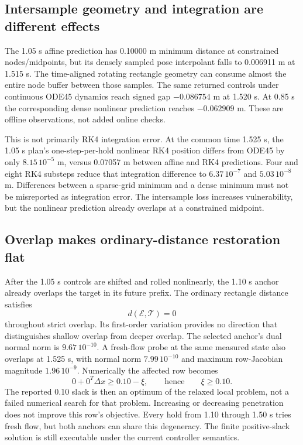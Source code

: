 \documentclass[11pt]{article}
\begin{document}
\subsection{Intersample geometry and integration are different effects}
The 1.05 s affine prediction has 0.10000 m minimum distance at constrained
nodes/midpoints, but its densely sampled pose interpolant falls to
0.006911 m at 1.515 s. The time-aligned rotating rectangle geometry can
consume almost the entire node buffer between those samples. The same
returned controls under continuous ODE45 dynamics reach signed gap
$-0.086754$ m at 1.520 s. At 0.85 s the corresponding dense nonlinear
prediction reaches $-0.062909$ m. These are offline observations, not added
online checks.

This is not primarily RK4 integration error. At the common time 1.525 s,
the 1.05 s plan's one-step-per-hold nonlinear RK4 position differs from
ODE45 by only $8.15\,10^{-5}$ m, versus 0.07057 m between affine and RK4
predictions. Four and eight RK4 substeps reduce that integration difference
to $6.37\,10^{-7}$ and $5.03\,10^{-8}$ m. Differences between a sparse-grid
minimum and a dense minimum must not be misreported as integration error.
The intersample loss increases vulnerability, but the nonlinear prediction
already overlaps at a constrained midpoint.

\subsection{Overlap makes ordinary-distance restoration flat}
After the 1.05 s controls are shifted and rolled nonlinearly, the 1.10 s
anchor already overlaps the target in its future prefix. The ordinary
rectangle distance satisfies
\[
 d(\mathcal E,\mathcal T)=0
\]
throughout strict overlap. Its first-order variation provides no direction
that distinguishes shallow overlap from deeper overlap. The selected
anchor's dual normal norm is $9.67\,10^{-10}$. A fresh-flow probe at the
same measured state also overlaps at 1.525 s, with normal norm
$7.99\,10^{-10}$ and maximum row-Jacobian magnitude $1.96\,10^{-9}$.
Numerically the affected row becomes
\[
 0+0^T\Delta x\ge 0.10-\xi,
 \qquad\text{hence}\qquad \xi\ge0.10.
\]
The reported 0.10 slack is then an optimum of the relaxed local problem,
not a failed numerical search for that problem. Increasing or decreasing
penetration does not improve this row's objective. Every hold from 1.10
through 1.50 s tries fresh flow, but both anchors can share this degeneracy.
The finite positive-slack solution is still executable under the current
controller semantics.
\end{document}
